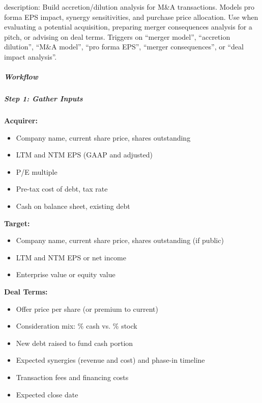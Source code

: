 \documentclass[11pt]{article}
\begin{document}
description: Build accretion/dilution analysis for M\&A transactions. Models pro forma EPS impact, synergy sensitivities, and purchase price allocation. Use when evaluating a potential acquisition, preparing merger consequences analysis for a pitch, or advising on deal terms. Triggers on ``merger model'', ``accretion dilution'', ``M\&A model'', ``pro forma EPS'', ``merger consequences'', or ``deal impact analysis''.


\subparagraph{Workflow}\mbox{}\par

\subparagraph{Step 1: Gather Inputs}\mbox{}\par

\textbf{Acquirer:}

\begin{itemize}[leftmargin=*,itemsep=2pt,topsep=2pt]
\item {} Company name, current share price, shares outstanding
\item {} LTM and NTM EPS (GAAP and adjusted)
\item {} P/E multiple
\item {} Pre-tax cost of debt, tax rate
\item {} Cash on balance sheet, existing debt
\end{itemize}

\textbf{Target:}

\begin{itemize}[leftmargin=*,itemsep=2pt,topsep=2pt]
\item {} Company name, current share price, shares outstanding (if public)
\item {} LTM and NTM EPS or net income
\item {} Enterprise value or equity value
\end{itemize}

\textbf{Deal Terms:}

\begin{itemize}[leftmargin=*,itemsep=2pt,topsep=2pt]
\item {} Offer price per share (or premium to current)
\item {} Consideration mix: \% cash vs. \% stock
\item {} New debt raised to fund cash portion
\item {} Expected synergies (revenue and cost) and phase-in timeline
\item {} Transaction fees and financing costs
\item {} Expected close date
\end{itemize}
\end{document}
